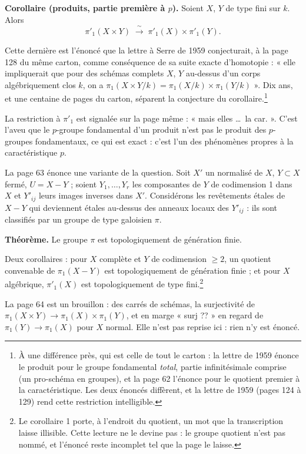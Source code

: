 \documentclass[11pt,a4paper]{article}
\begin{document}
\textbf{Corollaire (produits, partie première à $p$).} Soient $X$, $Y$ de type
fini sur $k$. Alors
\[
  \pi'_{1}(X \times Y) \;\xrightarrow{\ \sim\ }\;
  \pi'_{1}(X) \times \pi'_{1}(Y) .
\]

Cette dernière est l'énoncé que la lettre à Serre de 1959 conjecturait, à la
page 128 du même carton, comme conséquence de sa suite exacte d'homotopie :
« elle impliquerait que pour des schémas complets $X$, $Y$ au-dessus d'un
corps algébriquement clos $k$, on a
$\pi_{1}(X\times Y/k) = \pi_{1}(X/k)\times\pi_{1}(Y/k)$ ». Dix ans, et une
centaine de pages du carton, séparent la conjecture du
corollaire.\footnote{À une différence près, qui est celle de tout le carton :
la lettre de 1959 énonce le produit pour le groupe fondamental \emph{total},
partie infinitésimale comprise (un pro-schéma en groupes), et la page 62
l'énonce pour le quotient premier à la caractéristique. Les deux énoncés
diffèrent, et la lettre de 1959 (pages 124 à 129) rend cette restriction
intelligible.}

La restriction à $\pi'_{1}$ est signalée sur la page même : « mais elles …\
la car. ». C'est l'aveu que le $p$-groupe fondamental d'un produit n'est pas le
produit des $p$-groupes fondamentaux, ce qui est exact : c'est l'un des
phénomènes propres à la caractéristique $p$.

La page 63 énonce une variante de la question. Soit $X'$ un normalisé de $X$,
$Y \subset X$ fermé, $U = X - Y$ ; soient $Y_{1}, \dots, Y_{r}$ les composantes
de $Y$ de codimension 1 dans $X$ et $Y'_{ij}$ leurs images inverses dans $X'$.
Considérons les revêtements étales de $X - Y$ qui deviennent étales au-dessus
des anneaux locaux des $Y'_{ij}$ : ils sont classifiés par un groupe de type
galoisien $\pi$.

\textbf{Théorème.} Le groupe $\pi$ est topologiquement de génération finie.

Deux corollaires : pour $X$ complète et $Y$ de codimension $\geqslant 2$, un
quotient convenable de $\pi_{1}(X - Y)$ est topologiquement de génération
finie ; et pour $X$ algébrique, $\pi'_{1}(X)$ est topologiquement de type
fini.\footnote{Le corollaire 1 porte, à l'endroit du quotient, un mot que la
transcription laisse illisible. Cette lecture ne le devine pas : le groupe
quotient n'est pas nommé, et l'énoncé reste incomplet tel que la page le
laisse.}

La page 64 est un brouillon : des carrés de schémas, la surjectivité de
$\pi_{1}(X\times Y)\to\pi_{1}(X)\times\pi_{1}(Y)$, et en marge « surj ?? » en
regard de $\pi_{1}(Y)\to\pi_{1}(X)$ pour $X$ normal. Elle n'est pas reprise
ici : rien n'y est énoncé.
\end{document}
